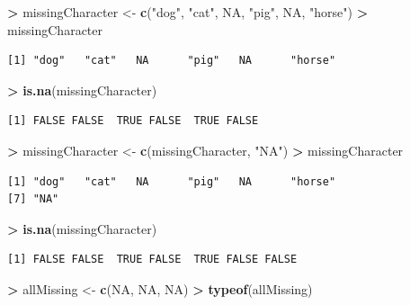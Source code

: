 \documentclass[]{krantz}
\makeatletter
\newenvironment{Shaded}{\begin{snugshade}}{\end{snugshade}}
\newcommand{\KeywordTok}[1]{\textcolor[rgb]{0.27,0.27,0.27}{\textbf{#1}}}
\newcommand{\NormalTok}[1]{#1}
\newcommand{\OperatorTok}[1]{\textcolor[rgb]{0.43,0.43,0.43}{\textbf{#1}}}
\newcommand{\OtherTok}[1]{\textcolor[rgb]{0.37,0.37,0.37}{#1}}
\newcommand{\StringTok}[1]{\textcolor[rgb]{0.5,0.5,0.5}{#1}}
\newenvironment{kframe}{%
\medskip{}
\setlength{\fboxsep}{.8em}
 \def\at@end@of@kframe{}%
 \ifinner\ifhmode%
  \def\at@end@of@kframe{\end{minipage}}%
  \begin{minipage}{\columnwidth}%
 \fi\fi%
 \def\FrameCommand##1{\hskip\@totalleftmargin \hskip-\fboxsep
 \colorbox{shadecolor}{##1}\hskip-\fboxsep
     \hskip-\linewidth \hskip-\@totalleftmargin \hskip\columnwidth}%
 \MakeFramed {\advance\hsize-\width
   \@totalleftmargin\z@ \linewidth\hsize
   \@setminipage}}%
 {\par\unskip\endMakeFramed%
 \at@end@of@kframe}
\renewenvironment{Shaded}{\begin{kframe}}{\end{kframe}}
\makeatother
\begin{document}
\begin{Shaded}
\begin{Highlighting}[]
\OperatorTok{>}\StringTok{ }\NormalTok{missingCharacter <-}\StringTok{ }\KeywordTok{c}\NormalTok{(}\StringTok{"dog"}\NormalTok{, }\StringTok{"cat"}\NormalTok{, }\OtherTok{NA}\NormalTok{, }\StringTok{"pig"}\NormalTok{, }\OtherTok{NA}\NormalTok{, }\StringTok{"horse"}\NormalTok{)}
\OperatorTok{>}\StringTok{ }\NormalTok{missingCharacter}
\end{Highlighting}
\end{Shaded}

\begin{verbatim}
[1] "dog"   "cat"   NA      "pig"   NA      "horse"
\end{verbatim}

\begin{Shaded}
\begin{Highlighting}[]
\OperatorTok{>}\StringTok{ }\KeywordTok{is.na}\NormalTok{(missingCharacter)}
\end{Highlighting}
\end{Shaded}

\begin{verbatim}
[1] FALSE FALSE  TRUE FALSE  TRUE FALSE
\end{verbatim}

\begin{Shaded}
\begin{Highlighting}[]
\OperatorTok{>}\StringTok{ }\NormalTok{missingCharacter <-}\StringTok{ }\KeywordTok{c}\NormalTok{(missingCharacter, }\StringTok{"NA"}\NormalTok{)}
\OperatorTok{>}\StringTok{ }\NormalTok{missingCharacter}
\end{Highlighting}
\end{Shaded}

\begin{verbatim}
[1] "dog"   "cat"   NA      "pig"   NA      "horse"
[7] "NA"   
\end{verbatim}

\begin{Shaded}
\begin{Highlighting}[]
\OperatorTok{>}\StringTok{ }\KeywordTok{is.na}\NormalTok{(missingCharacter)}
\end{Highlighting}
\end{Shaded}

\begin{verbatim}
[1] FALSE FALSE  TRUE FALSE  TRUE FALSE FALSE
\end{verbatim}

\begin{Shaded}
\begin{Highlighting}[]
\OperatorTok{>}\StringTok{ }\NormalTok{allMissing <-}\StringTok{ }\KeywordTok{c}\NormalTok{(}\OtherTok{NA}\NormalTok{, }\OtherTok{NA}\NormalTok{, }\OtherTok{NA}\NormalTok{)}
\OperatorTok{>}\StringTok{ }\KeywordTok{typeof}\NormalTok{(allMissing)}
\end{Highlighting}
\end{Shaded}
\end{document}
